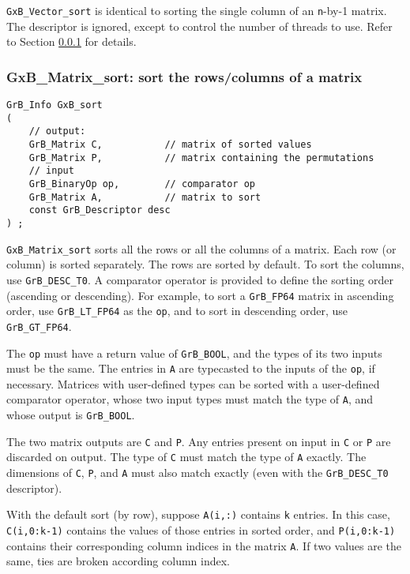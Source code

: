 \documentclass[12pt]{article}
\begin{document}
\verb'GxB_Vector_sort' is identical to sorting the single column of an
\verb'n'-by-1 matrix.  The descriptor is ignored, except to control the number
of threads to use.  Refer to Section \ref{matrix_sort} for details.

\subsubsection{{\sf GxB\_Matrix\_sort:} sort the rows/columns of a matrix}
\label{matrix_sort}

\begin{mdframed}[userdefinedwidth=6in]
{\footnotesize
\begin{verbatim}
GrB_Info GxB_sort
(
    // output:
    GrB_Matrix C,           // matrix of sorted values
    GrB_Matrix P,           // matrix containing the permutations
    // input
    GrB_BinaryOp op,        // comparator op
    GrB_Matrix A,           // matrix to sort
    const GrB_Descriptor desc
) ;
\end{verbatim}
} \end{mdframed}

\verb'GxB_Matrix_sort' sorts all the rows or all the columns of a matrix.
Each row (or column) is sorted separately.  The rows are sorted by default.
To sort the columns, use \verb'GrB_DESC_T0'.  A comparator operator is
provided to define the sorting order (ascending or descending).
For example, to sort a \verb'GrB_FP64' matrix in ascending order,
use \verb'GrB_LT_FP64' as the \verb'op', and to sort in descending order,
use \verb'GrB_GT_FP64'.

The \verb'op' must have a return value of \verb'GrB_BOOL', and the types of
its two inputs must be the same.  The entries in \verb'A' are typecasted to
the inputs of the \verb'op', if necessary.  Matrices with user-defined types
can be sorted with a user-defined comparator operator, whose two input types
must match the type of \verb'A', and whose output is \verb'GrB_BOOL'.

The two matrix outputs are \verb'C' and \verb'P'.  Any entries present on input
in \verb'C' or \verb'P' are discarded on output.  The type of \verb'C' must
match the type of \verb'A' exactly.  The dimensions of \verb'C', \verb'P', and
\verb'A' must also match exactly (even with the \verb'GrB_DESC_T0'
descriptor).

With the default sort (by row), suppose \verb'A(i,:)' contains \verb'k'
entries.  In this case, \verb'C(i,0:k-1)' contains the values of those entries
in sorted order, and \verb'P(i,0:k-1)' contains their corresponding column
indices in the matrix \verb'A'.  If two values are the same, ties are broken
according column index.
\end{document}
